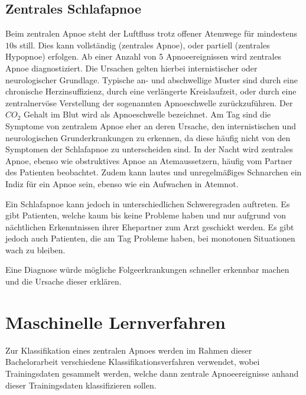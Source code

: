 \subsection{Zentrales Schlafapnoe}
Beim zentralen Apnoe steht der Luftfluss trotz offener Atemwege für mindestens $10\si{\s}$ still. Dies kann vollständig (zentrales Apnoe), oder partiell (zentrales Hypopnoe) erfolgen. 
Ab einer Anzahl von 5 Apnoeereignissen wird zentrales Apnoe diagnostiziert.
Die Ursachen gelten hierbei internistischer oder neurologischer Grundlage.
Typische an- und abschwellige Muster sind durch eine chronische Herzinsuffizienz, durch eine verlängerte Kreislaufzeit, oder durch eine zentralnervöse Verstellung der sogenannten Apnoeschwelle zurückzuführen.
Der $CO_2$ Gehalt im Blut wird als Apnoeschwelle bezeichnet.
Am Tag sind die Symptome von zentralem Apnoe eher an deren Ursache, den internistischen und neurologischen Grunderkrankungen zu erkennen, da diese häufig nicht von den Symptomen der Schlafapnoe zu unterscheiden sind. 
In der Nacht wird zentrales Apnoe, ebenso wie obstruktives Apnoe an Atemaussetzern, häufig vom Partner des Patienten beobachtet.
Zudem kann lautes und unregelmäßiges Schnarchen ein Indiz für ein Apnoe sein, ebenso wie ein Aufwachen in Atemnot.

Ein Schlafapnoe kann jedoch in unterschiedlichen Schweregraden auftreten. 
Es gibt Patienten, welche kaum bis keine Probleme haben und nur aufgrund von nächtlichen Erkenntnissen ihrer Ehepartner zum Arzt geschickt werden. 
Es gibt jedoch auch Patienten, die am Tag Probleme haben, bei monotonen Situationen wach zu bleiben.

Eine Diagnose würde mögliche Folgeerkrankungen schneller erkennbar machen und die Ursache dieser erklären.

\section{Maschinelle Lernverfahren}
Zur Klassifikation eines zentralen Apnoes werden im Rahmen dieser Bachelorarbeit verschiedene Klassifikationsverfahren verwendet, wobei Trainingsdaten gesammelt werden, welche dann zentrale Apnoeereignisse anhand dieser Trainingsdaten klassifizieren sollen.

